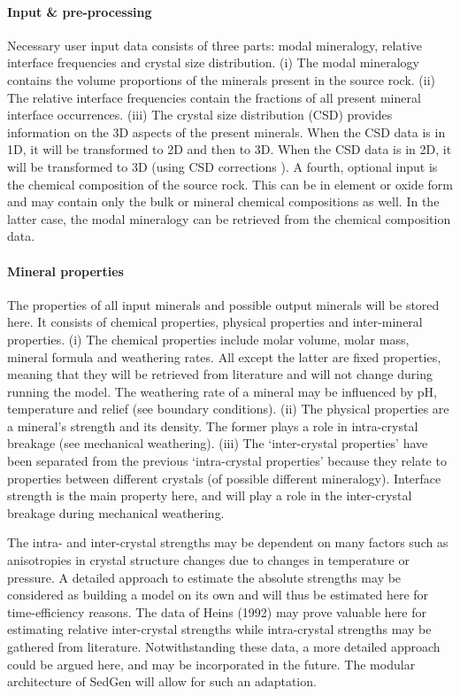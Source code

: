 \paragraph{Input \& pre-processing}
Necessary user input data consists of three parts: modal mineralogy, relative interface frequencies and crystal size distribution. (i) The modal mineralogy contains the volume proportions of the minerals present in the source rock. (ii) The relative interface frequencies contain the fractions of all present mineral interface occurrences. (iii) The crystal size distribution (CSD) provides information on the 3D aspects of the present minerals. When the CSD data is in 1D, it will be transformed to 2D and then to 3D. When the CSD data is in 2D, it will be transformed to 3D (using CSD corrections \cite{Higgins2010}). A fourth, optional input is the chemical composition of the source rock. This can be in element or oxide form and may contain only the bulk or mineral chemical compositions as well. In the latter case, the modal mineralogy can be retrieved from the chemical composition data.

\paragraph{Mineral properties}
The properties of all input minerals and possible output minerals will be stored here. It consists of chemical properties, physical properties and inter-mineral properties. (i) The chemical properties include molar volume, molar mass, mineral formula and weathering rates. All except the latter are fixed properties, meaning that they will be retrieved from literature and will not change during running the model. The weathering rate of a mineral may be influenced by pH, temperature and relief (see boundary conditions). (ii) The physical properties are a mineral’s strength and its density. The former plays a role in intra-crystal breakage (see mechanical weathering). (iii) The ‘inter-crystal properties’ have been separated from the previous ‘intra-crystal properties’ because they relate to properties between different crystals (of possible different mineralogy). Interface strength is the main property here, and will play a role in the inter-crystal breakage during mechanical weathering. \linebreak

The intra- and inter-crystal strengths may be dependent on many factors such as anisotropies in crystal structure changes due to changes in temperature or pressure. A detailed approach to estimate the absolute strengths may be considered as building a model on its own and will thus be estimated here for time-efficiency reasons. The data of Heins (1992) may prove valuable here for estimating relative inter-crystal strengths while intra-crystal strengths may be gathered from literature. Notwithstanding these data, a more detailed approach could be argued here, and may be incorporated in the future. The modular architecture of SedGen will allow for such an adaptation. 

